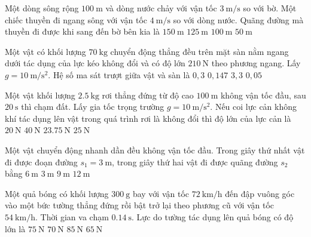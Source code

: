 \begin{ex}
	Một dòng sông rộng $\SI{100}{\meter}$ và dòng nước chảy với vận tốc $\SI{3}{\meter/\second}$ so với bờ. Một chiếc thuyền đi ngang sông với vận tốc $\SI{4}{\meter/\second}$ so với dòng nước. Quãng đường mà thuyền đi được khi sang đến bờ bên kia là
	\choice
	{$\SI{150}{\meter}$}
	{\True $\SI{125}{\meter}$}
	{$\SI{100}{\meter}$}
	{$\SI{50}{\meter}$}
	\loigiai{}
\end{ex}
\begin{ex}
	Một vật có khối lượng $\SI{70}{\kilogram}$ chuyển động thẳng đều trên mặt sàn nằm ngang dưới tác dụng của lực kéo không đổi và có độ lớn $\SI{210}{\newton}$ theo phương ngang. Lấy $g=\SI{10}{\meter/\second^2}$. Hệ số ma sát trượt giữa vật và sàn là
	\choice
	{\True $0,3$}
	{$0,147$}
	{$3,3$}
	{$0,05$}
	\loigiai{}
\end{ex}
\begin{ex}
	Một vật khối lượng $\SI{2.5}{\kilogram}$ rơi thẳng đứng từ độ cao $\SI{100}{\meter}$ không vận tốc đầu, sau $\SI{20}{\second}$ thì chạm đất. Lấy gia tốc trọng trường $g=\SI{10}{\meter/\second^2}$. Nếu coi lực cản không khí tác dụng lên vật trong quá trình rơi là không đổi thì độ lớn của lực cản là
	\choice
	{$\SI{20}{\newton}$}
	{$\SI{40}{\newton}$}
	{\True $\SI{23.75}{\newton}$}
	{$\SI{25}{\newton}$}
	\loigiai{}
\end{ex}
\begin{ex}
	Một vật chuyển động nhanh dần đều không vận tốc đầu. Trong giây thứ nhất vật đi được đoạn đường $s_1=\SI{3}{\meter}$, trong giây thứ hai vật đi được quãng đường $s_2$ bằng	
	\choice
	{$\SI{6}{\meter}$}
	{$\SI{3}{\meter}$}
	{\True $\SI{9}{\meter}$}
	{$\SI{12}{\meter}$}
	\loigiai{}
\end{ex}
\begin{ex}
	Một quả bóng có khối lượng $\SI{300}{\gram}$ bay với vận tốc $\SI{72}{\kilo\meter/\hour}$ đến đập vuông góc vào một bức tường thẳng đứng rồi bật trở lại theo phương cũ với vận tốc $\SI{54}{\kilo\meter/\hour}$. Thời gian va chạm $\SI{0.14}{\second}$. Lực do tường tác dụng lên quả bóng có độ lớn là
	\choice
	{\True $\SI{75}{\newton}$}
	{$\SI{70}{\newton}$}
	{$\SI{85}{\newton}$}
	{$\SI{65}{\newton}$}
	\loigiai{}
\end{ex}
